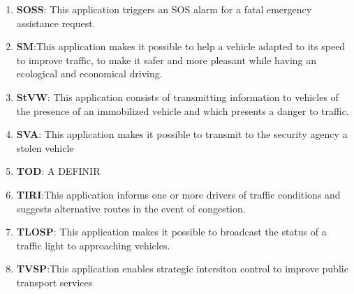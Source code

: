 \begin{enumerate}
\item \textbf{\acrlong{SOSS}}: This application triggers an SOS alarm for a fatal emergency assistance request. \cite{etsi_etsi_tr_102_638_intelligent_2009,al-sultan_comprehensive_2014}
\item \textbf{\acrfull{SM}}:This application makes it possible to help a vehicle adapted to its speed to improve traffic, to make it safer and more pleasant while having an ecological and economical driving. \cite{etsi_etsi_tr_102_638_intelligent_2009,karagiannis_vehicular_2011,rakha_eco-driving_2011,xiuzheng_model_2015,noauthor_intelligent_nodate}
\item \textbf{\acrfull{StVW}}: This application consists of transmitting information to vehicles of the presence of an immobilized vehicle and which presents a danger to traffic. \cite{etsi_etsi_tr_102_638_intelligent_2009,karagiannis_vehicular_2011}
\item \textbf{\acrfull{SVA}}: This application makes it possible to transmit to the security agency a stolen vehicle \cite{etsi_etsi_tr_102_638_intelligent_2009}
\item \textbf{\acrfull{TOD}}: A DEFINIR
\item \textbf{\acrfull{TIRI}}:This application informs one or more drivers of traffic conditions and suggests alternative routes in the event of congestion. \cite{etsi_etsi_tr_102_638_intelligent_2009,xu_dsrc_2017,noauthor_perspectives_2016,noauthor_intelligent_nodate}
\item \textbf{\acrfull{TLOSP}}: This application makes it possible to broadcast the status of a traffic light to approaching vehicles. \cite{etsi_etsi_tr_102_638_intelligent_2009,vandung_nguyen_efficient_2016,noauthor_intelligent_nodate}
\item \textbf{\acrfull{TVSP}}:This application enables strategic intersiton control to improve public transport services \cite{hu_transit_2014,hu_coordinated_2015,yang_implementing_2019,lee_transit_2017,zeng_potential_2012,he_multi-modal_2014}

\end{enumerate}
